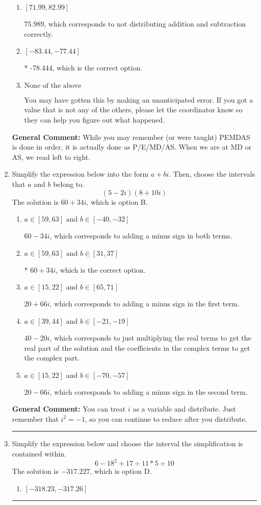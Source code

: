 \documentclass{extbook}[14pt]
\newcommand{\litem}[1]{\item #1

\rule{\textwidth}{0.4pt}}
\begin{document}
\begin{enumerate}
{\begin{enumerate}[label=\Alph*.]
 -126.667, which corresponds to not distributing a negative correctly.
\item \( [71.99, 82.99] \)

 75.989, which corresponds to not distributing addition and subtraction correctly.
\item \( [-83.44, -77.44] \)

* -78.444, which is the correct option.
\item \( \text{None of the above} \)

 You may have gotten this by making an unanticipated error. If you got a value that is not any of the others, please let the coordinator know so they can help you figure out what happened.
\end{enumerate}

\textbf{General Comment:} While you may remember (or were taught) PEMDAS is done in order, it is actually done as P/E/MD/AS. When we are at MD or AS, we read left to right.
}
\litem{
Simplify the expression below into the form $a+bi$. Then, choose the intervals that $a$ and $b$ belong to.
\[ (5 - 2 i)(8 + 10 i) \]The solution is \( 60 + 34 i \), which is option B.\begin{enumerate}[label=\Alph*.]
\item \( a \in [59, 63] \text{ and } b \in [-40, -32] \)

 $60 - 34 i$, which corresponds to adding a minus sign in both terms.
\item \( a \in [59, 63] \text{ and } b \in [31, 37] \)

* $60 + 34 i$, which is the correct option.
\item \( a \in [15, 22] \text{ and } b \in [65, 71] \)

 $20 + 66 i$, which corresponds to adding a minus sign in the first term.
\item \( a \in [39, 44] \text{ and } b \in [-21, -19] \)

 $40 - 20 i$, which corresponds to just multiplying the real terms to get the real part of the solution and the coefficients in the complex terms to get the complex part.
\item \( a \in [15, 22] \text{ and } b \in [-70, -57] \)

 $20 - 66 i$, which corresponds to adding a minus sign in the second term.
\end{enumerate}

\textbf{General Comment:} You can treat $i$ as a variable and distribute. Just remember that $i^2=-1$, so you can continue to reduce after you distribute.
}
\litem{
Simplify the expression below and choose the interval the simplification is contained within.
\[ 6 - 18^2 + 17 \div 11 * 5 \div 10 \]The solution is \( -317.227 \), which is option D.\begin{enumerate}[label=\Alph*.]
\item \( [-318.23, -317.26] \)


\end{enumerate}}
\end{enumerate}
\end{document}
